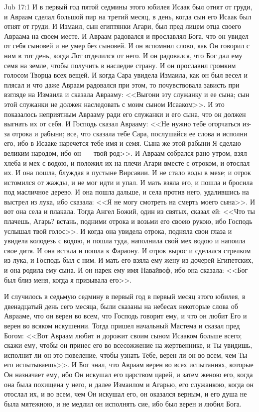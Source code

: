 \vs Jub 17:1
И в первый год пятой седмины этого юбилея Исаак
был отнят от груди, и Авраам сделал большой пир на
третий месяц, в день, когда сын его Исаак был
отнят от груди. И Измаил, сын египтянки Агари, был
пред лицем отца своего Авраама на своем месте. И
Авраам радовался и прославлял Бога, что он увидел
от себя сыновей и не умер без сыновей. И он
вспомнил слово, как Он говорил с ним в тот день,
когда Лот отделился от него. И он радовался, что
Бог дал ему семя на земле, чтобы получить в
наследие страну. И он прославил громким голосом
Творца всех вещей. И когда Сара увидела Измаила,
как он был весел и плясал и что даже Авраам
радовался при этом, то почувствовала зависть при
взгляде на Измаила и сказала Аврааму: <<Выгони
эту служанку и ее сына; сын этой служанки не
должен наследовать с моим сыном Исааком>>. И это
показалось неприятным Аврааму ради его служанки
и его сына, что он должен выгнать их от себя. И
Господь сказал Аврааму: <<Не нужно тебе
огорчаться из-за отрока и рабыни; все, что сказала
тебе Сара, послушайся ее слова и исполни его, ибо
в Исааке наречется тебе имя и семя. Сына же этой
рабыни Я сделаю великим народом, ибо он~--- твой
род>>. И Авраам собрался рано утром, взял хлеба и
мех с водою, и положил их на плечи Агари вместе с
отроком, и отослал их. И она пошла, блуждая в
пустыне Вирсавии. И не стало воды в мехе; и отрок
истомился от жажды, и не мог идти и упал. И мать
взяла его, и пошла и бросила под масличное дерево.
И она пошла дальше, и села против него, удалившись
на выстрел из лука, ибо сказала: <<Я не могу
смотреть на смерть моего сына>>. И вот она села и
плакала. Тогда Ангел Божий, один из святых, сказал
ей: <<Что ты плачешь, Агарь? встань, подними
отрока и возьми его своею рукою, ибо Господь
услышал твой голос>>. И когда она увидела
отрока, подняла свои глаза и увидела колодезь с
водою, и пошла туда, наполнила свой мех водою и
напоила свое дитя. И она встала и пошла к Фараону.
И отрок вырос и сделался стрелком из лука, и
Господь был с ним. И мать его взяла ему жену из
дочерей Египетских, и она родила ему сына. И он
нарек ему имя Навайвоф, ибо она сказала: <<Бог
был близ меня, когда я призывала его>>.

И случилось в седьмую седмину в первый год в
первый месяц этого юбилея, в двенадцатый день
сего месяца, были сказаны на небесах некоторые
слова об Аврааме, что он верен во всем, что
Господь говорит ему, и что он любит Его и верен во
всяком искушении. Тогда пришел начальный Мастема
и сказал пред Богом: <<Вот Авраам любит и
дорожит своим сыном Исааком больше всего; скажи
ему, чтобы он принес его во всесожжение на
жертвеннике, и Ты увидишь, исполнит ли он это
повеление, чтобы узнать Тебе, верен ли он во всем,
чем Ты его испытываешь>>. И Бог знал, что Авраам
верен во всех испытаниях, которые Он назначает
ему, ибо Он искушал его царством царей, и затем
женою его, когда она была похищена у него, и далее
Измаилом и Агарью, его служанкою, когда он
отослал их, и во всем, чем Он искушал его, он
оказался верным, и его душа не была мятежною, и не
медлил он исполнять сие, ибо был верен и любил
Бога.

